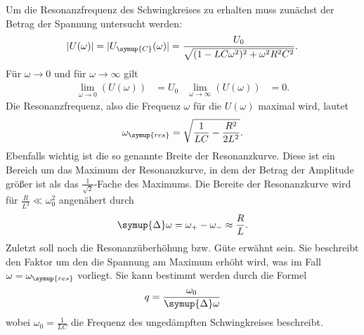 Um die Resonanzfrequenz des Schwingkreises zu erhalten muss zunächst der Betrag der Spannung untersucht werden:
\begin{equation}
    |U(\omega)|=|U_{\symup{C}}(\omega)| = \frac{U_0}{\sqrt{(1-LC\omega^2)^2+\omega^2R^2C^2}}.
    \label{eq:Spannung}
\end{equation}
Für $\omega \to 0$ und für $\omega \to \infty$ gilt
\begin{align*}
    \lim \limits_{\omega \to 0} (U(\omega)) &= U_0 & \lim \limits_{\omega \to \infty} (U(\omega)) &= 0.
\end{align*}
Die Resonanzfrequenz, also die Frequenz $\omega$ für die $U(\omega)$ maximal wird, lautet
\begin{equation}
    \omega_{\symup{res}} = \sqrt{\frac{1}{LC}-\frac{R^2}{2L^2}}.
    \label{eq:Resonanzfrequenz}
\end{equation}
Ebenfalls wichtig ist die so genannte Breite der Resonanzkurve. Diese ist ein Bereich um das Maximum der Resonanzkurve,
in dem der Betrag der Amplitude größer ist als das $\frac{1}{\sqrt{2}}$-Fache des Maximums. Die Bereite der Resonanzkurve
wird für $\frac{R}{L^2} \ll \omega_0^2$ angenähert durch
\begin{equation}
    \symup{\Delta}\omega = \omega_{+}-\omega_{-} \approx \frac{R}{L}.
    \label{eq:Breite Resonanzkurve}
\end{equation}
Zuletzt soll noch die Resonanzüberhöhung bzw. Güte erwähnt sein. Sie beschreibt den Faktor um den die Spannung am Maximum erhöht wird,
was im Fall $\omega=\omega_{\symup{res}}$ vorliegt.
Sie kann bestimmt werden durch die Formel
\begin{equation}
    q=\frac{\omega_0}{\symup{\Delta}\omega}
    \label{eq:Güte}
\end{equation}
wobei $\omega_{0}=\frac{1}{LC}$ die Frequenz des ungedämpften Schwingkreises beschreibt.